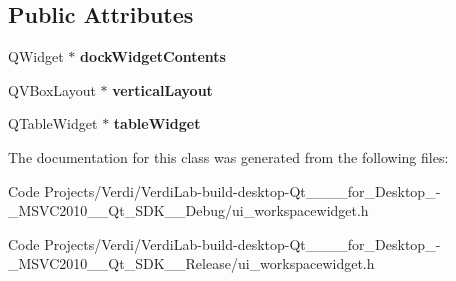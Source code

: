 \subsection*{\-Public \-Attributes}
\begin{DoxyCompactItemize}
\item 
\hypertarget{class_ui___workspace_widget_abaa39f3355da48a511c9e61a039d4f9c}{\-Q\-Widget $\ast$ {\bfseries dock\-Widget\-Contents}}\label{class_ui___workspace_widget_abaa39f3355da48a511c9e61a039d4f9c}

\item 
\hypertarget{class_ui___workspace_widget_aaa3b8151e39ea44ca187c8da55e810ce}{\-Q\-V\-Box\-Layout $\ast$ {\bfseries vertical\-Layout}}\label{class_ui___workspace_widget_aaa3b8151e39ea44ca187c8da55e810ce}

\item 
\hypertarget{class_ui___workspace_widget_aa47d23102a9484da21bd6e7476066001}{\-Q\-Table\-Widget $\ast$ {\bfseries table\-Widget}}\label{class_ui___workspace_widget_aa47d23102a9484da21bd6e7476066001}

\end{DoxyCompactItemize}


\-The documentation for this class was generated from the following files\-:\begin{DoxyCompactItemize}
\item 
\-Code Projects/\-Verdi/\-Verdi\-Lab-\/build-\/desktop-\/\-Qt\-\_\-\_\-\_\-\_\-for\-\_\-\-Desktop\-\_\--\/\-\_\-\-M\-S\-V\-C2010\-\_\-\-\_\-\-Qt\-\_\-\-S\-D\-K\-\_\-\-\_\-\-Debug/ui\-\_\-workspacewidget.\-h\item 
\-Code Projects/\-Verdi/\-Verdi\-Lab-\/build-\/desktop-\/\-Qt\-\_\-\_\-\_\-\_\-for\-\_\-\-Desktop\-\_\--\/\-\_\-\-M\-S\-V\-C2010\-\_\-\-\_\-\-Qt\-\_\-\-S\-D\-K\-\_\-\-\_\-\-Release/ui\-\_\-workspacewidget.\-h\end{DoxyCompactItemize}
